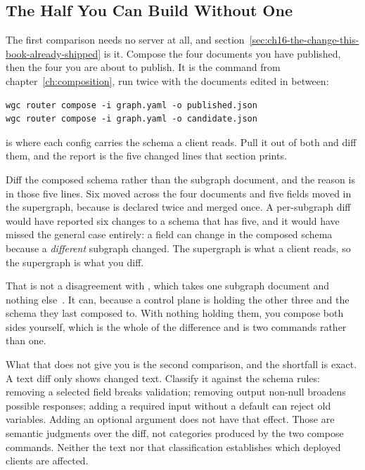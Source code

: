 \subsection{The Half You Can Build Without One}

%
The first comparison needs no server at all, and
section~\ref{sec:ch16-the-change-this-book-already-shipped} is it. Compose the
four documents you have published, then the four you are about to publish. It
is the command from chapter~\ref{ch:composition}, run twice with the documents
edited in between:

\begin{verbatim}
wgc router compose -i graph.yaml -o published.json
wgc router compose -i graph.yaml -o candidate.json
\end{verbatim}

 is where each config carries the schema a
client reads. Pull it out of both and diff them, and the report is the five
changed lines that section prints.

%
Diff the composed schema rather than the subgraph document, and the reason is
in those five lines. Six moved across the four documents and five fields
moved in the supergraph, because  is declared twice and
merged once. A per-subgraph diff would have reported six changes to a schema
that has five, and it would have missed the general case entirely: a field can
change in the composed schema because a \emph{different} subgraph changed. The
supergraph is what a client reads, so the supergraph is what you diff.

%
That is not a disagreement with , which takes one
subgraph document and nothing else~\autocite{cosmoclicheck}. It can, because a
control plane is holding
the other three and the schema they last composed to. With nothing holding
them, you compose both sides yourself, which is the whole of the difference
and is two commands rather than one.

%
What that does not give you is the second comparison, and the shortfall is
exact. A text diff only shows changed text. Classify it against the schema
rules: removing a selected field breaks validation; removing output non-null
broadens possible responses; adding a required input without a default can
reject old variables. Adding an optional argument does not have that effect.
Those are semantic judgments over the diff, not categories produced by the
two compose commands. Neither the text nor that classification establishes
which deployed clients are affected.

